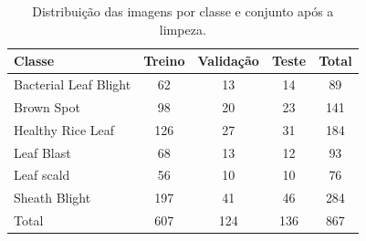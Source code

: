 \begin{table}[t]
\centering
\caption{Distribuição das imagens por classe e conjunto após a limpeza.}
\label{tab:dataset}
\begin{tabular}{lcccc}
\toprule
Classe & Treino & Validação & Teste & Total \\
\midrule
Bacterial Leaf Blight & 62 & 13 & 14 & 89 \\
Brown Spot & 98 & 20 & 23 & 141 \\
Healthy Rice Leaf & 126 & 27 & 31 & 184 \\
Leaf Blast & 68 & 13 & 12 & 93 \\
Leaf scald & 56 & 10 & 10 & 76 \\
Sheath Blight & 197 & 41 & 46 & 284 \\
\midrule
Total & 607 & 124 & 136 & 867 \\
\bottomrule
\end{tabular}
\end{table}
